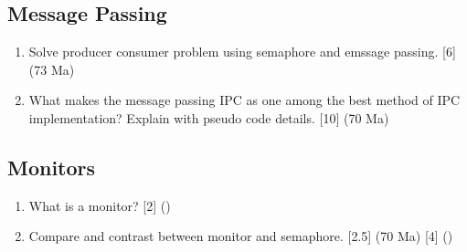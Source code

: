 \documentclass[12pt]{article}
\begin{document}
	\subsection{Message Passing}
		\begin{enumerate}[noitemsep, topsep=0pt]
			\item Solve producer consumer problem using semaphore and emssage passing. \hfill [6] (73 Ma)
			
			\item What makes the message passing IPC as one among the best method of IPC implementation? Explain with pseudo code details. \hfill [10] (70 Ma)
		\end{enumerate}
		
	\subsection{Monitors}
		\begin{enumerate}[noitemsep, topsep=0pt]
			\item What is a monitor? \hfill [2] ()
			
			\item Compare and contrast between monitor and semaphore. \hfill [2.5] (70 Ma) [4] ()
		\end{enumerate}
		
\end{document}
